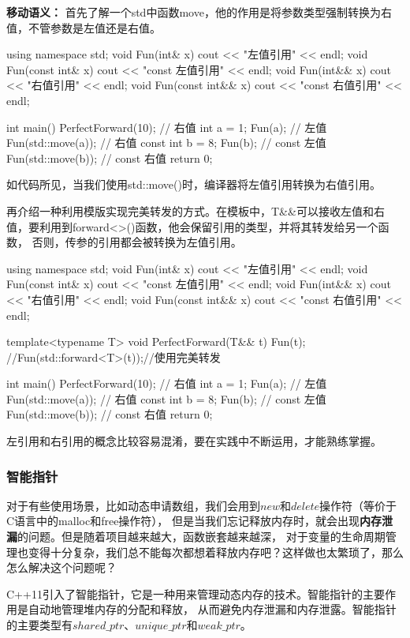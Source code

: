 \textbf{移动语义：}
首先了解一个std中函数move，他的作用是将参数类型强制转换为右值，不管参数是左值还是右值。
\begin{tcode}
using namespace std;
void Fun(int& x) { cout << "左值引用" << endl; }
void Fun(const int& x) { cout << "const 左值引用" << endl; }
void Fun(int&& x) { cout << "右值引用" << endl; }
void Fun(const int&& x) { cout << "const 右值引用" << endl; }

int main() {
    PerfectForward(10);           // 右值
    int a = 1;
    Fun(a);            // 左值
    Fun(std::move(a)); // 右值
    const int b = 8;
    Fun(b);      // const 左值
    Fun(std::move(b)); // const 右值
    return 0;
}
\end{tcode}
如代码所见，当我们使用std::move()时，编译器将左值引用转换为右值引用。

再介绍一种利用模版实现完美转发的方式。在模板中，T\&\&可以接收左值和右值，要利用到forward<>()函数，他会保留引用的类型，并将其转发给另一个函数，
否则，传参的引用都会被转换为左值引用。

\begin{tcode}
using namespace std;
void Fun(int& x) { cout << "左值引用" << endl; }
void Fun(const int& x) { cout << "const 左值引用" << endl; }
void Fun(int&& x) { cout << "右值引用" << endl; }
void Fun(const int&& x) { cout << "const 右值引用" << endl; }

template<typename T>
void PerfectForward(T&& t)
{
    Fun(t);
    //Fun(std::forward<T>(t));//使用完美转发
}

int main() {
    PerfectForward(10);           // 右值
    int a = 1;
    Fun(a);            // 左值
    Fun(std::move(a)); // 右值
    const int b = 8;
    Fun(b);      // const 左值
    Fun(std::move(b)); // const 右值
    return 0;
}
\end{tcode}
左引用和右引用的概念比较容易混淆，要在实践中不断运用，才能熟练掌握。

\subsubsection{智能指针}
对于有些使用场景，比如动态申请数组，我们会用到$new$和$delete$操作符（等价于C语言中的malloc和free操作符），
但是当我们忘记释放内存时，就会出现\textbf{内存泄漏}的问题。但是随着项目越来越大，函数嵌套越来越深，
对于变量的生命周期管理也变得十分复杂，我们总不能每次都想着释放内存吧？这样做也太繁琐了，那么怎么解决这个问题呢？

C++11引入了智能指针，它是一种用来管理动态内存的技术。智能指针的主要作用是自动地管理堆内存的分配和释放，
从而避免内存泄漏和内存泄露。智能指针的主要类型有\textbf{$shared\_ptr$}、\textbf{$unique\_ptr$}和\textbf{$weak\_ptr$}。

